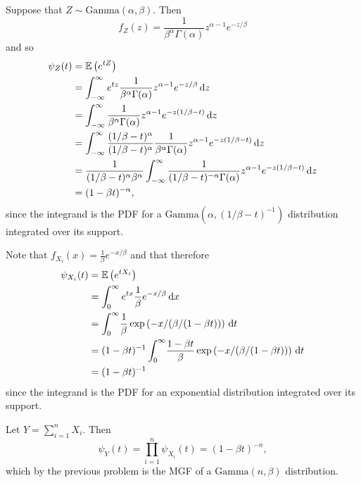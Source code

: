 \begin{ex}
  Suppose that $Z\sim\text{Gamma}(\alpha, \beta)$. Then
  \[
    f_Z(z)=\frac{1}{\beta^\alpha \Gamma(\alpha)}z^{\alpha-1}e^{-z/\beta}
  \]
  and so
  \begin{align*}
    \psi_Z(t)
     & =\mathbb{E}\left(e^{tZ}\right)                                                                                                                                   \\
     & =\int_{-\infty}^\infty e^{tz}\frac{1}{\beta^\alpha \Gamma(\alpha)}z^{\alpha-1}e^{-z/\beta}\,\mathrm{d}{z}                                             \\
     & =\int_{-\infty}^\infty \frac{1}{\beta^\alpha \Gamma(\alpha)}z^{\alpha-1}e^{-z(1/\beta-t)}\,\mathrm{d}{z}                                              \\
     & =\int_{-\infty}^\infty \frac{(1/\beta-t)^\alpha}{(1/\beta-t)^\alpha}\frac{1}{\beta^\alpha \Gamma(\alpha)}z^{\alpha-1}e^{-z(1/\beta-t)}\,\mathrm{d}{z} \\
     & =\frac{1}{(1/\beta-t)^\alpha\beta^\alpha}
    \int_{-\infty}^\infty \frac{1}{(1/\beta-t)^{-\alpha}\Gamma(\alpha)}z^{\alpha-1}e^{-z(1/\beta-t)}\,\mathrm{d}{z}                                          \\
     & =(1-\beta t)^{-\alpha},
  \end{align*}
  since the integrand is the PDF for a $\text{Gamma}(\alpha, (1/\beta-t)^{-1})$
  distribution integrated over its support.
\end{ex}

\begin{ex}
  Note that $f_{X_i}(x)=\frac{1}{\beta} e^{-x/\beta}$ and that therefore
  \begin{align*}
    \psi_{X_i}(t)
     & =\mathbb{E}\left(e^{tX_i}\right)                                                                                           \\
     & =\int_{0}^\infty e^{tx}\frac{1}{\beta} e^{-x/\beta}\,\mathrm{d}{x}                                              \\
     & =\int_0^\infty\!\frac{1}{\beta}\exp\left(-x/(\beta/(1-\beta t))\right)\,\mathrm{d}{t}                           \\
     & =(1-\beta t)^{-1}\int_0^\infty\! \frac{1-\beta t}{\beta} \exp\left(-x/(\beta/(1-\beta t))\right)\,\mathrm{d}{t} \\
     & =(1-\beta t)^{-1}
  \end{align*}
  since the integrand is the PDF for an exponential distribution integrated over
  its support.

  Let $Y=\sum_{i=1}^n X_i$. Then
  \[
    \psi_Y(t)
    =\prod_{i=1}^n \psi_{X_i}(t)
    =\left(1-\beta t\right)^{-n},
  \]
  which by the previous problem is the MGF of a $\text{Gamma}(n,\beta)$
  distribution.
\end{ex}
